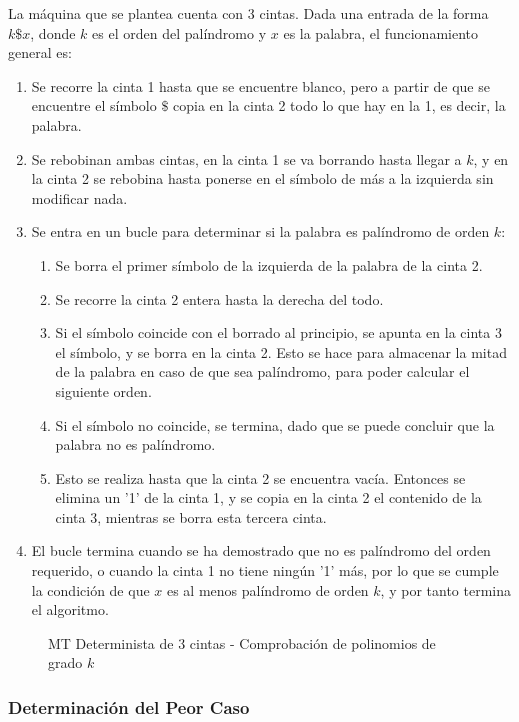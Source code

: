 \documentclass{uc3mpracticas}
\begin{document}
  La máquina que se plantea cuenta con 3 cintas. Dada una entrada de la forma $ k\$x $, donde $k$ es el orden del palíndromo y $x$ es la palabra, el funcionamiento general es:
    \begin{enumerate}
      \item Se recorre la cinta 1 hasta que se encuentre blanco, pero a partir de que se encuentre el símbolo $\$$ copia en la cinta 2 todo lo que hay en la 1, es decir, la palabra.
      \item Se rebobinan ambas cintas, en la cinta 1 se va borrando hasta llegar a $k$, y en la cinta 2 se rebobina hasta ponerse en el símbolo de más a la izquierda sin modificar nada.
      \item Se entra en un bucle para determinar si la palabra es palíndromo de orden $k$:
      \begin{enumerate}
        \item Se borra el primer símbolo de la izquierda de la palabra de la cinta 2.
        \item Se recorre la cinta 2 entera hasta la derecha del todo.
        \item Si el símbolo coincide con el borrado al principio, se apunta en la cinta 3 el símbolo, y se borra en la cinta 2. Esto se hace para almacenar la mitad de la palabra en caso de que sea palíndromo, para poder calcular el siguiente orden.
        \item Si el símbolo no coincide, se termina, dado que se puede concluir que la palabra no es palíndromo.
        \item Esto se realiza hasta que la cinta 2 se encuentra vacía. Entonces se elimina un '1' de la cinta 1, y se copia en la cinta 2 el contenido de la cinta 3, mientras se borra esta tercera cinta.
      \end{enumerate}
      \item El bucle termina cuando se ha demostrado que no es palíndromo del orden requerido, o cuando la cinta 1 no tiene ningún '1' más, por lo que se cumple la condición de que $x$ es al menos palíndromo de orden $k$, y por tanto termina el algoritmo.
    \end{enumerate}

    \begin{figure}[!h]
      \caption{MT Determinista de 3 cintas - Comprobación de polinomios de grado $k$}
    \end{figure}


  \subsubsection{Determinación del Peor Caso}
\end{document}
